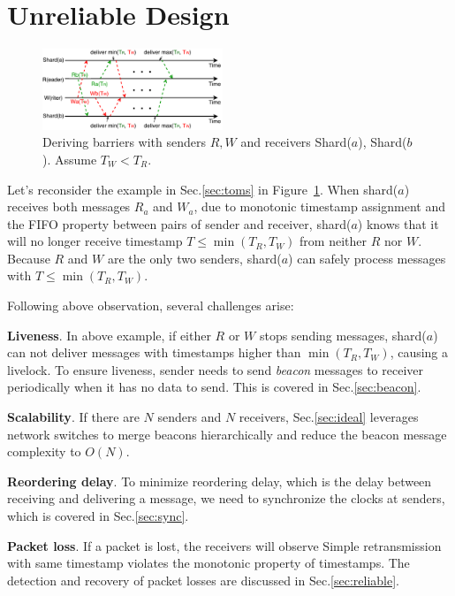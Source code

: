 \section{Unreliable \sys Design}

\begin{figure}[t]
\centering
\includegraphics[width=0.48\textwidth]{images/derive_barriers.pdf}
\caption{Deriving barriers with senders $R, W$ and receivers Shard($a$), Shard($b$). Assume $T_W < T_R$.}
\label{fig:barrier}
\vspace{-1em}
\end{figure}

Let's reconsider the example in Sec.\ref{sec:toms} in Figure~\ref{fig:barrier}.
When shard($a$) receives both messages $R_a$ and $W_a$, due to monotonic timestamp assignment and the FIFO property between pairs of sender and receiver, shard($a$) knows that it will no longer receive timestamp $T \leq \min(T_R, T_W)$ from neither $R$ nor $W$.
Because $R$ and $W$ are the only two senders, shard($a$) can safely process messages with $T \leq \min(T_R, T_W)$.

Following above observation, several challenges arise:

\textbf{Liveness}.
In above example, if either $R$ or $W$ stops sending messages, shard($a$) can not deliver messages with timestamps higher than $\min(T_R,T_W)$, causing a livelock.
To ensure liveness, sender needs to send \textit{beacon} messages to receiver  periodically when it has no data to send.
This is covered in Sec.\ref{sec:beacon}.

\textbf{Scalability}.
If there are $N$ senders and $N$ receivers, 
Sec.\ref{sec:ideal} leverages network switches to merge beacons hierarchically and reduce the beacon message complexity to $O(N)$.

\textbf{Reordering delay}. To minimize reordering delay, which is the delay between receiving and delivering a message, we need to synchronize the clocks at senders, which is covered in Sec.\ref{sec:sync}.

\textbf{Packet loss}.
If a packet is lost, the receivers will observe 
Simple retransmission with same timestamp violates the monotonic property of timestamps.
The detection and recovery of packet losses are discussed in Sec.\ref{sec:reliable}.

